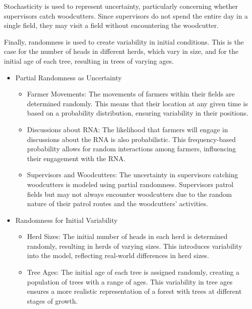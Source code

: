\documentclass{article}
\begin{document}
        Stochasticity is used to represent uncertainty, particularly concerning whether supervisors catch woodcutters. Since supervisors do not spend the entire day in a single field, they may visit a field without encountering the woodcutter.

        Finally, randomness is used to create variability in initial conditions. This is the case for the number of heads in different herds, which vary in size, and for the initial age of each tree, resulting in trees of varying ages.

        \begin{itemize}
            \item Partial Randomness as Uncertainty
            \begin{itemize}
                \item Farmer Movements: The movements of farmers within their fields are determined randomly. This means that their location at any given time is based on a probability distribution, ensuring variability in their positions.
                \item Discussions about RNA: The likelihood that farmers will engage in discussions about the RNA is also probabilistic. This frequency-based probability allows for random interactions among farmers, influencing their engagement with the RNA.
                \item Supervisors and Woodcutters: The uncertainty in supervisors catching woodcutters is modeled using partial randomness. Supervisors patrol fields but may not always encounter woodcutters due to the random nature of their patrol routes and the woodcutters' activities.
            \end{itemize}

            \item Randomness for Initial Variability
            \begin{itemize}
                \item Herd Sizes: The initial number of heads in each herd is determined randomly, resulting in herds of varying sizes. This introduces variability into the model, reflecting real-world differences in herd sizes.
                \item Tree Ages: The initial age of each tree is assigned randomly, creating a population of trees with a range of ages. This variability in tree ages ensures a more realistic representation of a forest with trees at different stages of growth.\\
            \end{itemize}
        \end{itemize}
\end{document}
